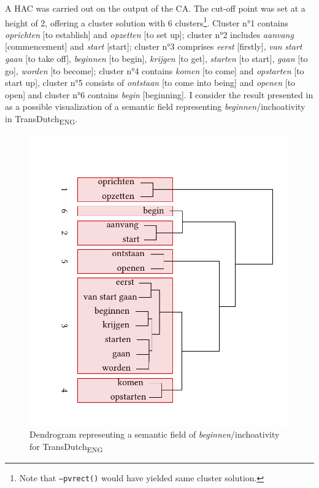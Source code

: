 A HAC was carried out on the output of the CA. The cut-off point was set at a height of 2, offering a cluster solution with 6 clusters\footnote{Note that \texttt{–pvrect()} would have yielded same cluster solution.}. Cluster n°1 contains \textit{oprichten} [to establish] and \textit{opzetten} [to set up]; cluster n°2 includes \textit{aanvang} [commencement] and \textit{start} [start]; cluster n°3 comprises \textit{eerst} [firstly], \textit{van} \textit{start} \textit{gaan} [to take off], \textit{beginnen} [to begin], \textit{krijgen} [to get], \textit{starten} [to start], \textit{gaan} [to go], \textit{worden} [to become]; cluster n°4 contains \textit{komen} [to come] and \textit{opstarten} [to start up], cluster n°5 consists of \textit{ontstaan} [to come into being] and \textit{openen} [to open] and cluster n°6 contains \textit{begin} [beginning]. I consider the result presented in  as a possible visualization of a semantic field representing \textit{beginnen}/inchoativity in TransDutch\textsubscript{ENG}.

\begin{figure}
\includegraphics[width=\textwidth]{figures/tree65.pdf}
\caption{\label{fig:4:64}  Dendrogram representing a semantic field of \textit{beginnen}/inchoativity for TransDutch\textsubscript{ENG}}
\end{figure}

